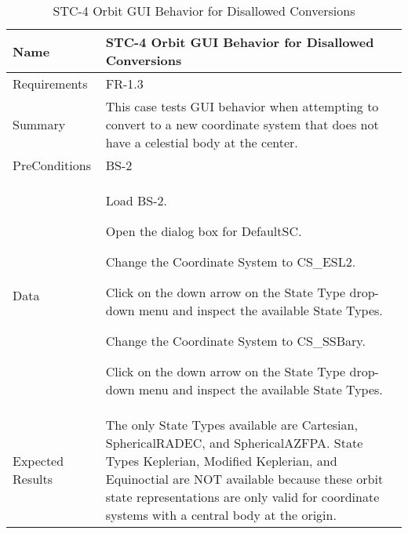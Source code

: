 \begin{table}[htbp!]
\centering
      \begin{tabular}{|p{1.05 in} |p{4.75 in} |}
      \hline
         \rowcolor[rgb]{0.8,0.8,0.8} Name & STC-4 Orbit GUI Behavior for Disallowed Conversions\\
         \hline
         Requirements & FR-1.3\\  \hline
         Summary &
         This  case tests GUI behavior when attempting to convert to a new coordinate system that does
         not have a celestial body at the center.
         \\     \hline
         PreConditions & BS-2\\     \hline
         Data &
         \begin{compactenum}
             \item Load BS-2.
             \item Open the dialog box for DefaultSC.
             \item Change the Coordinate System to CS\_ESL2.
             \item Click on the down arrow on the State Type drop-down menu and inspect the available State Types.
             \item Change the Coordinate System to CS\_SSBary.
             \item Click on the down arrow on the State Type drop-down menu and inspect the available State Types.
         \end{compactenum}
         \\ \hline
         Expected Results & The only State Types available are Cartesian, SphericalRADEC, and SphericalAZFPA.   State Types Keplerian, Modified Keplerian, and Equinoctial are NOT available because these orbit state representations are only valid for coordinate systems with a central body at the origin.\\
      \hline
\end{tabular}
      \label{Table: STC-4}
      \caption{STC-4 Orbit GUI Behavior for Disallowed Conversions}
\end{table} 